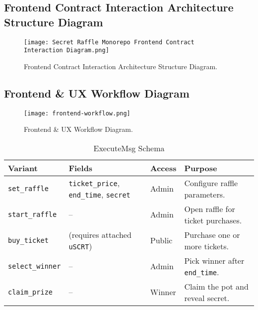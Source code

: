 \documentclass{article}
\begin{document}
\subsection{Frontend Contract Interaction Architecture Structure Diagram}
\begin{figure}[h]
  \vspace{-0.5cm}
  \hspace{-2cm}
  \texttt{[image: Secret Raffle Monorepo Frontend Contract Interaction Diagram.png]}
  \caption{Frontend Contract Interaction Architecture Structure Diagram.}
  \label{fig:Frontend Contract Interaction Architecture Structure Diagram Appendix}
\end{figure}

\newpage

\subsection{Frontend \& UX Workflow Diagram}
\begin{figure}[h]
  \vspace{0cm}
  \hspace{0cm}
  \texttt{[image: frontend-workflow.png]}
  \caption{Frontend \& UX Workflow Diagram.}
  \label{fig:Frontend Workflow Appendix}
\end{figure}

\newpage

\begin{table}[h]
  \centering
  \caption{ExecuteMsg Schema}
  \label{tab:ExecuteMsg Schema}
  \begin{tabular}{@{}llll@{}}
    \toprule
    \textbf{Variant} & \textbf{Fields} & \textbf{Access} & \textbf{Purpose} \\
    \midrule
    \texttt{set\_raffle} & \texttt{ticket\_price}, \texttt{end\_time}, \texttt{secret} & Admin & Configure raffle parameters. \\
    \midrule
    \texttt{start\_raffle} & -- & Admin & Open raffle for ticket purchases. \\
    \midrule
    \texttt{buy\_ticket} & (requires attached \texttt{uSCRT}) & Public & Purchase one or more tickets. \\
    \midrule
    \texttt{select\_winner} & -- & Admin & Pick winner after \texttt{end\_time}. \\
    \midrule
    \texttt{claim\_prize} & -- & Winner & Claim the pot and reveal secret. \\
    \bottomrule
  \end{tabular}
\end{table}
\end{document}
